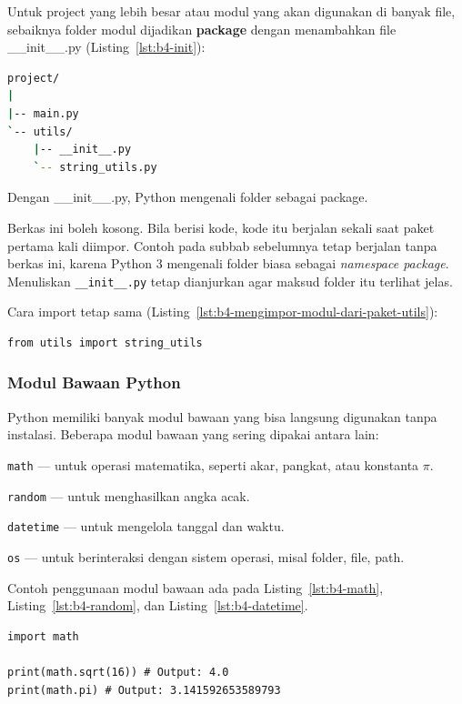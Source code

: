 Untuk project yang lebih besar atau modul yang akan digunakan di banyak file, sebaiknya folder modul dijadikan \textbf{package} dengan menambahkan file __init__.py (Listing~\ref{lst:b4-init}):

\begin{lstlisting}[language=bash, caption={Susunan folder paket dengan __init__.py}, label={lst:b4-init}]
project/
|
|-- main.py
`-- utils/
    |-- __init__.py
    `-- string_utils.py
\end{lstlisting}

Dengan __init__.py, Python mengenali folder sebagai package.

Berkas ini boleh kosong. Bila berisi kode, kode itu berjalan sekali saat paket pertama kali diimpor. Contoh pada subbab sebelumnya tetap berjalan tanpa berkas ini, karena Python 3 mengenali folder biasa sebagai \textit{namespace package}. Menuliskan \texttt{__init__.py} tetap dianjurkan agar maksud folder itu terlihat jelas.

Cara import tetap sama (Listing~\ref{lst:b4-mengimpor-modul-dari-paket-utils}):

\begin{lstlisting}[style=PythonStyle, caption={Mengimpor modul dari paket utils}, label={lst:b4-mengimpor-modul-dari-paket-utils}]
from utils import string_utils
\end{lstlisting}

\subsubsection{Modul Bawaan Python}

Python memiliki banyak modul bawaan yang bisa langsung digunakan tanpa instalasi. Beberapa modul bawaan yang sering dipakai antara lain:

\texttt{math} — untuk operasi matematika, seperti akar, pangkat, atau konstanta \(\pi\).

\texttt{random} — untuk menghasilkan angka acak.

\texttt{datetime} — untuk mengelola tanggal dan waktu.

\texttt{os} — untuk berinteraksi dengan sistem operasi, misal folder, file, path.

Contoh penggunaan modul bawaan ada pada Listing~\ref{lst:b4-math}, Listing~\ref{lst:b4-random}, dan Listing~\ref{lst:b4-datetime}.

\begin{lstlisting}[style=PythonStyle, caption={Kode Python: math_module.py}, label={lst:b4-math}]
import math

print(math.sqrt(16)) # Output: 4.0
print(math.pi) # Output: 3.141592653589793
\end{lstlisting}

